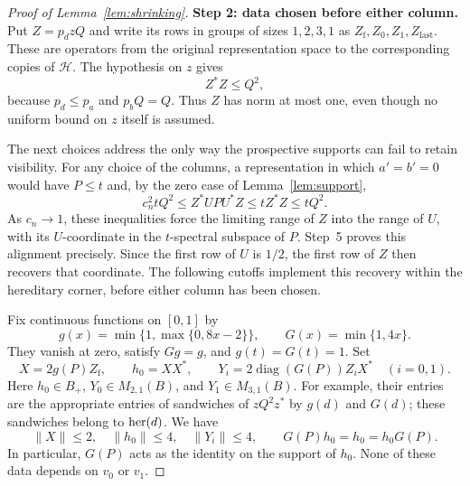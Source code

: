 \begin{proof}[Proof of Lemma~\ref{lem:shrinking}]
\medskip
\noindent\textbf{Step 2: data chosen before either column.}
Put $Z=p_d zQ$ and write its rows in groups of sizes $1,2,3,1$ as
$Z_{\mathrm f},Z_0,Z_1,Z_{\mathrm{last}}$.  These are operators from the
original representation space to the corresponding copies of
$\mathcal H$.  The hypothesis on $z$ gives
\begin{equation}\label{shr:Z-bound}
 Z^*Z\le Q^2,
\end{equation}
because $p_d\le p_a$ and $p_bQ=Q$.  Thus $Z$ has norm at most one, even
though no uniform bound on $z$ itself is assumed.

The next choices address the only way the prospective supports can fail
to retain visibility.  For any choice of the columns, a representation
in which $a'=b'=0$ would have $P\le t$ and, by the zero case of
Lemma~\ref{lem:support},
\begin{equation}\label{shr:alignment-chain}
 c_n^2tQ^2\le Z^*UPU^*Z\le tZ^*Z\le tQ^2.
\end{equation}
As $c_n\to1$, these inequalities force the limiting range of $Z$ into
the range of $U$, with its $U$-coordinate in the $t$-spectral subspace
of $P$.  Step~5 proves this alignment precisely.  Since the first row
of $U$ is $1/2$, the first row of $Z$ then recovers that coordinate.
The following cutoffs implement this recovery within the hereditary
corner, before either column has been chosen.

Fix continuous functions on $[0,1]$ by
\[
 g(x)=\min\{1,\max\{0,8x-2\}\},\qquad G(x)=\min\{1,4x\}.
\]
They vanish at zero, satisfy $Gg=g$, and $g(t)=G(t)=1$.  Set
\begin{equation}\label{shr:XY}
 X=2g(P)Z_{\mathrm f},\qquad h_0=XX^*,\qquad
 Y_i=2\operatorname{diag}(G(P))Z_iX^*\quad(i=0,1).
\end{equation}
Here $h_0\in B_+$, $Y_0\in M_{2,1}(B)$, and
$Y_1\in M_{3,1}(B)$.  For example, their entries are the appropriate
entries of sandwiches of $zQ^2z^*$ by $g(d)$ and $G(d)$; these sandwiches
belong to $\operatorname{her}(d)$.  We have
\begin{equation}\label{shr:initial-bounds}
 \|X\|\le2,\quad \|h_0\|\le4,\quad \|Y_i\|\le4,
 \qquad G(P)h_0=h_0=h_0G(P).
\end{equation}
In particular, $G(P)$ acts as the identity on the support of $h_0$.
None of these data depends on $v_0$ or $v_1$.


\end{proof}
